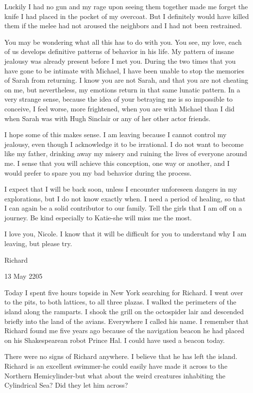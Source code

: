 \documentclass[]{article}
\begin{document}
Luckily I had no gun and my rage upon seeing them together made me forget the knife I had placed in the pocket of my overcoat. But I definitely would have killed them if the melee had not aroused the neighbors and I had not been restrained.

You may be wondering what all this has to do with you. You see, my love, each of us develops definitive patterns of behavior in his life. My pattern of insane jealousy was already present before I met you. During the two times that you have gone to be intimate with Michael, I have been unable to stop the memories of Sarah from returning. I know you are not Sarah, and that you are not cheating on me, but nevertheless, my emotions return in that same lunatic pattern. In a very strange sense, because the idea of your betraying me is so impossible to conceive, I feel worse, more frightened, when you are with Michael than I did when Sarah was with Hugh Sinclair or any of her other actor friends.

I hope some of this makes sense. I am leaving because I cannot control my jealousy, even though I acknowledge it to be irrational. I do not want to become like my father, drinking away my misery and ruining the lives of everyone around me. I sense that you will achieve this conception, one way or another, and I would prefer to spare you my bad behavior during the process.

I expect that I will be back soon, unless I encounter unforeseen dangers in my explorations, but I do not know exactly when. I need a period of healing, so that I can again be a solid contributor to our family. Tell the girls that I am off on a journey. Be kind especially to Katie-she will miss me the most.

I love you, Nicole. I know that it will be difficult for you to understand why I am leaving, but please try.

Richard

13 May 2205

Today I spent five hours topside in New York searching for Richard. I went over to the pits, to both lattices, to all three plazas. I walked the perimeters of the island along the ramparts. I shook the grill on the octospider lair and descended briefly into the land of the avians. Everywhere I called his name. I remember that Richard found me five years ago because of the navigation beacon he had placed on his Shakespearean robot Prince Hal. I could have used a beacon today.

There were no signs of Richard anywhere. I believe that he has left the island. Richard is an excellent swimmer-he could easily have made it across to the Northern Hemicylinder-but what about the weird creatures inhabiting the Cylindrical Sea? Did they let him across?
\end{document}

